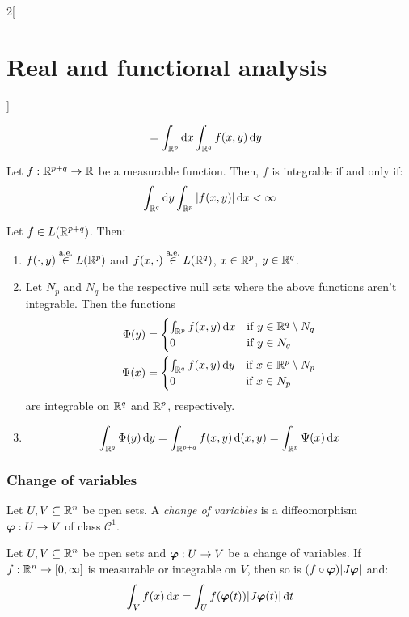\documentclass[../../../main_math.tex]{subfiles}
\begin{document}
\begin{multicols}{2}[\section{Real and functional analysis}]
\begin{corollary}
\begin{align*}
                                         & =\int_{\mathbb{R}^p}\dd{x}\int_{\mathbb{R}^q}f(x,y)\dd{y}
    \end{align*}
  \end{corollary}
  \begin{corollary}
    Let $f:\mathbb{R}^{p+q}\rightarrow\mathbb{R}$ be a measurable function. Then, $f$ is integrable if and only if: $$\int_{\mathbb{R}^q}\dd{y}\int_{\mathbb{R}^p}\abs{f(x,y)}\dd{x}<\infty$$
  \end{corollary}
  \begin{theorem}
    Let $f\in L(\mathbb{R}^{p+q})$. Then:
    \begin{enumerate}
      \item $f(\cdot,y)\overset{\text{a.e.}}{\in} L(\mathbb{R}^p)$ and $f(x,\cdot)\overset{\text{a.e.}}{\in}L(\mathbb{R}^q)$, $x\in\mathbb{R}^p$, $y\in\mathbb{R}^q$.
      \item Let $N_p$ and $N_q$ be the respective null sets where the above functions aren't integrable. Then the functions
            \begin{align*}
              \Phi(y) & =\begin{cases}
                           \int_{\mathbb{R}^p}f(x,y)\dd{x} & \text{if } y\in\mathbb{R}^q\setminus N_q \\
                           0                        & \text{if } y\in N_q
                         \end{cases} \\ \Psi(x)&=\begin{cases}
                \int_{\mathbb{R}^q}f(x,y)\dd{y} & \text{if } x\in\mathbb{R}^p\setminus N_p \\
                0                        & \text{if } x\in N_p
              \end{cases}
            \end{align*}
            are integrable on $\mathbb{R}^q$ and $\mathbb{R}^p$, respectively.
      \item \hfill $$\int_{\mathbb{R}^q}\Phi(y)\dd{y}=\int_{\mathbb{R}^{p+q}}f(x,y)\dd{(x,y)}=\int_{\mathbb{R}^p}\Psi(x)\dd{x}$$
    \end{enumerate}
  \end{theorem}
  \subsubsection{Change of variables}
  \begin{definition}
    Let $U,V\subseteq\mathbb{R}^n$ be open sets. A \emph{change of variables} is a diffeomorphism $\boldsymbol{\mathrm{\varphi}}:U\rightarrow V$ of class $\mathcal{C}^1$.
  \end{definition}
  \begin{theorem}
    Let $U,V\subseteq\mathbb{R}^n$ be open sets and $\boldsymbol{\mathrm{\varphi}}:U\rightarrow V$ be a change of variables. If $f:\mathbb{R}^n\rightarrow[0,\infty]$ is measurable or integrable on $V$, then so is $(f\circ\boldsymbol{\mathrm{\varphi}})\abs{J\boldsymbol{\mathrm{\varphi}}}$ and: $$\int_{V} f(x)\dd{x}=\int_Uf(\boldsymbol{\mathrm{\varphi}}(t))\abs{J\boldsymbol{\mathrm{\varphi}}(t)}\dd{t}$$
  \end{theorem}


\end{multicols}
\end{document}
